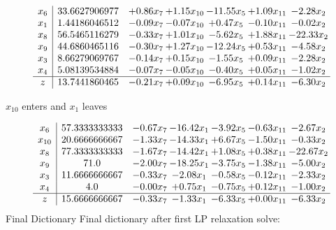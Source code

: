 \documentclass[8pt]{article}
\begin{document}
 \[\begin{array}{c| c c@{\hskip 2pt} c@{\hskip 2pt} c@{\hskip 2pt} c@{\hskip 2pt} c@{\hskip 2pt} }
 x_{6}   &  33.6627906977 & +  0.86 x_{7} & +  1.15 x_{10} & -11.55 x_{5} & +  1.09 x_{11} & -2.28 x_{2}\\
 x_{1}   &  1.44186046512 & -0.09 x_{7} & -0.07 x_{10} & +  0.47 x_{5} & -0.10 x_{11} & -0.02 x_{2}\\
 x_{8}   &  56.5465116279 & -0.33 x_{7} & +  1.01 x_{10} & -5.62 x_{5} & +  1.88 x_{11} & -22.33 x_{2}\\
 x_{9}   &  44.6860465116 & -0.30 x_{7} & +  1.27 x_{10} & -12.24 x_{5} & +  0.53 x_{11} & -4.58 x_{2}\\
 x_{3}   &  8.66279069767 & -0.14 x_{7} & +  0.15 x_{10} & -1.55 x_{5} & +  0.09 x_{11} & -2.28 x_{2}\\
 x_{4}   &  5.08139534884 & -0.07 x_{7} & -0.05 x_{10} & -0.40 x_{5} & +  0.05 x_{11} & -1.02 x_{2}\\
\hline
z    &  13.7441860465 & -0.21 x_{7} & +  0.09 x_{10} & -6.95 x_{5} & +  0.14 x_{11} & -6.30 x_{2}\\
\end{array}\]


 $ x_{10} $ enters and $ x_{1} $ leaves 

 \[\begin{array}{c| c c@{\hskip 2pt} c@{\hskip 2pt} c@{\hskip 2pt} c@{\hskip 2pt} c@{\hskip 2pt} }
 x_{6}   &  57.3333333333 & -0.67 x_{7} & -16.42 x_{1} & -3.92 x_{5} & -0.63 x_{11} & -2.67 x_{2}\\
 x_{10}   &  20.6666666667 & -1.33 x_{7} & -14.33 x_{1} & +  6.67 x_{5} & -1.50 x_{11} & -0.33 x_{2}\\
 x_{8}   &  77.3333333333 & -1.67 x_{7} & -14.42 x_{1} & +  1.08 x_{5} & +  0.38 x_{11} & -22.67 x_{2}\\
 x_{9}   &  71.0 & -2.00 x_{7} & -18.25 x_{1} & -3.75 x_{5} & -1.38 x_{11} & -5.00 x_{2}\\
 x_{3}   &  11.6666666667 & -0.33 x_{7} & -2.08 x_{1} & -0.58 x_{5} & -0.12 x_{11} & -2.33 x_{2}\\
 x_{4}   &  4.0 & -0.00 x_{7} & +  0.75 x_{1} & -0.75 x_{5} & +  0.12 x_{11} & -1.00 x_{2}\\
\hline
z    &  15.6666666667 & -0.33 x_{7} & -1.33 x_{1} & -6.33 x_{5} & +  0.00 x_{11} & -6.33 x_{2}\\
\end{array}\]
Final Dictionary
Final dictionary after first LP relaxation solve: 
\end{document}

